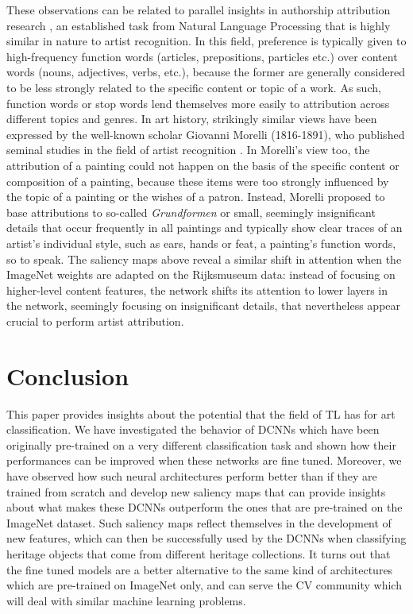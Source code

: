 \documentclass[runningheads]{llncs}
\begin{document}
These observations can be related to parallel insights in authorship attribution research \cite{stamatatos:2009}, an established task from Natural Language Processing that is highly similar in nature to artist recognition. In this field, preference is typically given to high-frequency function words (articles, prepositions, particles etc.) over content words (nouns, adjectives, verbs, etc.), because the former are generally considered to be less strongly related to the specific content or topic of a work. As such, function words or stop words lend themselves more easily to attribution across different topics and genres. In art history, strikingly similar views have been expressed by the well-known scholar Giovanni Morelli (1816-1891), who published seminal studies in the field of artist recognition \cite{wollheim:1972}. In Morelli's view too, the attribution of a painting could not happen on the basis of the specific content or composition of a painting, because these items were too strongly influenced by the topic of a painting or the wishes of a patron. Instead, Morelli proposed to base attributions to so-called \emph{Grundformen} or small, seemingly insignificant details that occur frequently in all paintings and typically show clear traces of an artist's individual style, such as ears, hands or feat, a painting's function words, so to speak. The saliency maps above reveal a similar shift in attention when the ImageNet weights are adapted on the Rijksmuseum data: instead of focusing on higher-level content features, the network shifts its attention to lower layers in the network, seemingly focusing on insignificant details, that nevertheless appear crucial to perform artist attribution.



\section{Conclusion} 
\label{sec:conclusion}
 
This paper provides insights about the potential that the field of TL has for art classification. We have investigated the behavior of DCNNs which have been originally pre-trained on a very different classification task and shown how their performances can be improved when these networks are fine tuned. Moreover, we have observed how such neural architectures perform better than if they are trained from scratch and develop new saliency maps that can provide insights about what makes these DCNNs outperform the ones that are pre-trained on the ImageNet dataset. Such saliency maps reflect themselves in the development of new features, which can then be successfully used by the DCNNs when classifying heritage objects that come from different heritage collections. It turns out that the fine tuned models are a better alternative to the same kind of architectures which are pre-trained on ImageNet only, and can serve the CV community which will deal with similar machine learning problems.
\end{document}
